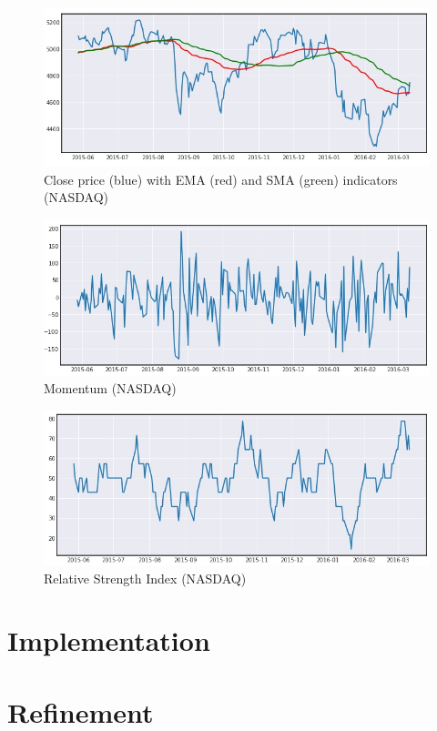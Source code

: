 \documentclass[a4paper,12pt]{article}
\begin{document}
\begin{figure}[h]
	\includegraphics[width=\textwidth]{nasdaqClose}
	\caption{Close price (blue) with EMA (red) and SMA (green) indicators (NASDAQ)}
	\centering
\end{figure}
\begin{figure}[h]
	\includegraphics[width=\textwidth]{nasdaqMom}
	\caption{Momentum (NASDAQ)}
	\centering
\end{figure}
\begin{figure}[h]
	\includegraphics[width=\textwidth]{nasdaqRSI}
	\caption{Relative Strength Index (NASDAQ)}
	\centering
\end{figure}

\section{Implementation}
\section{Refinement}
\end{document}
